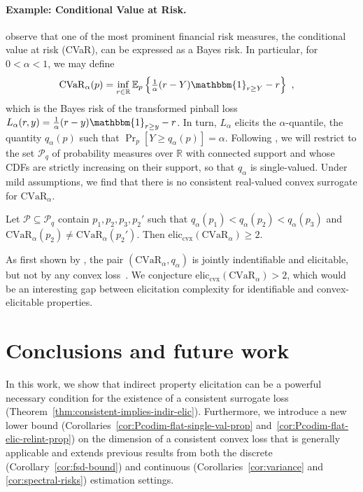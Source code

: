 \documentclass[anon,12pt]{colt2021} %
\newcommand{\reals}{\mathbb{R}}
\newcommand{\eliccvx}{\mathrm{elic}_\mathrm{cvx}}
\newcommand{\E}{\mathbb{E}}
\renewcommand{\P}{\mathcal{P}}
\newcommand{\CVaR}{\mathrm{CVaR}}
\newcommand{\ones}{\mathbbm{1}}
\begin{document}
\paragraph{Example: Conditional Value at Risk.}

\citet{frongillo2020elicitation} observe that one of the most prominent financial risk measures, the conditional value at risk (CVaR), can be expressed as a Bayes risk.
In particular, for $0 < \alpha < 1$, we may define
\begin{align}
  \CVaR_\alpha(p)
  &= \inf_{r\in\reals} \E_p\left\{ \tfrac 1 \alpha(r-Y)\ones_{r\geq Y}- r\right\}~,
  \label{eq:elic-complex-es-3}
\end{align}
which is the Bayes risk of the transformed pinball loss $L_\alpha(r,y) = \tfrac 1 \alpha(r-y)\ones_{r\geq y}-r$.
In turn, $L_\alpha$ elicits the $\alpha$-quantile, the quantity $q_\alpha(p)$ such that $\Pr_p[Y \geq q_\alpha(p)] = \alpha$.
Following \citet{frongillo2020elicitation}, we will restrict to the set $\P_q$ of probability measures over $\reals$ with connected support and whose CDFs are strictly increasing on their support, so that $q_\alpha$ is single-valued.
Under mild assumptions, we find that there is no consistent real-valued convex surrogate for $\CVaR_\alpha$.

\begin{corollary}
  \label{cor:spectral-risks}
  Let $\P\subseteq \P_q$ contain $p_1,p_2,p_3,p_2'$ such that $q_\alpha(p_1) < q_\alpha(p_2) < q_\alpha(p_3)$ and $\CVaR_\alpha(p_2) \neq \CVaR_\alpha(p_2')$.
  Then $\eliccvx(\CVaR_\alpha) \geq 2$.
\end{corollary}
As first shown by \citet{fissler2016higher}, the pair $(\CVaR_\alpha,q_\alpha)$ is jointly indentifiable and elicitable, but not by any convex loss~\citep[Prop.\ 4.2.31]{fissler2017higher}.
We conjecture $\eliccvx(\CVaR_\alpha) > 2$, which would be an interesting gap between elicitation complexity for identifiable and convex-elicitable properties.

\section{Conclusions and future work}\label{sec:conclusions}
In this work, we show that indirect property elicitation can be a powerful necessary condition for the existence of a consistent surrogate loss (Theorem~\ref{thm:consistent-implies-indir-elic}).
Furthermore, we introduce a new lower bound (Corollaries~\ref{cor:Pcodim-flat-single-val-prop} and~\ref{cor:Pcodim-flat-elic-relint-prop}) on the dimension of a consistent convex loss that is generally applicable and extends previous results from both the discrete (Corollary~\ref{cor:fsd-bound}) and continuous (Corollaries~\ref{cor:variance} and \ref{cor:spectral-risks}) estimation settings.
\end{document}
